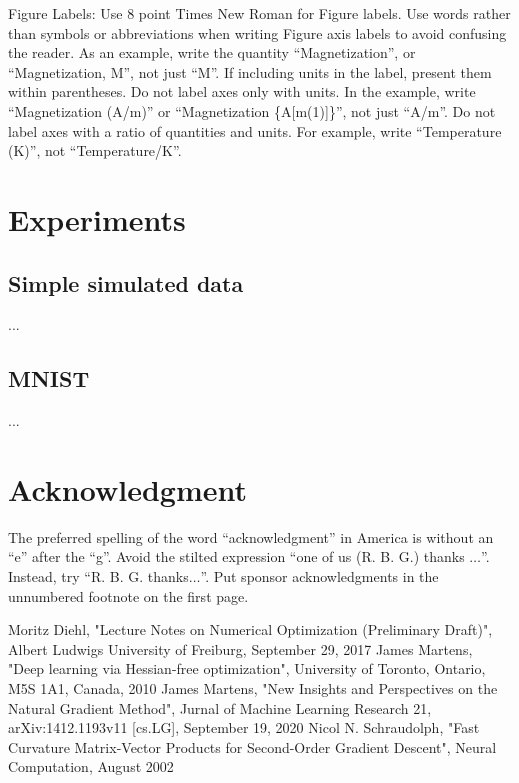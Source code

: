 \documentclass[conference]{IEEEtran}
\begin{document}
Figure Labels: Use 8 point Times New Roman for Figure labels. Use words 
rather than symbols or abbreviations when writing Figure axis labels to 
avoid confusing the reader. As an example, write the quantity 
``Magnetization'', or ``Magnetization, M'', not just ``M''. If including 
units in the label, present them within parentheses. Do not label axes only 
with units. In the example, write ``Magnetization (A/m)'' or ``Magnetization 
\{A[m(1)]\}'', not just ``A/m''. Do not label axes with a ratio of 
quantities and units. For example, write ``Temperature (K)'', not 
``Temperature/K''.

\section{Experiments}

\subsection{Simple simulated data}
...

\subsection{MNIST}
...

\section*{Acknowledgment}

The preferred spelling of the word ``acknowledgment'' in America is without 
an ``e'' after the ``g''. Avoid the stilted expression ``one of us (R. B. 
G.) thanks $\ldots$''. Instead, try ``R. B. G. thanks$\ldots$''. Put sponsor 
acknowledgments in the unnumbered footnote on the first page.


\begin{thebibliography}{00}
 Moritz Diehl, "Lecture Notes on Numerical Optimization (Preliminary Draft)", Albert Ludwigs University of Freiburg, September 29, 2017	
 James Martens, "Deep learning via Hessian-free optimization", University of Toronto, Ontario, M5S 1A1, Canada, 2010
 James Martens, "New Insights and Perspectives on the Natural Gradient Method", Jurnal of Machine Learning Research 21, arXiv:1412.1193v11 [cs.LG], September 19, 2020
 Nicol N. Schraudolph, "Fast Curvature Matrix-Vector Products for Second-Order
Gradient Descent", Neural Computation, August 2002
\end{thebibliography}
\end{document}
